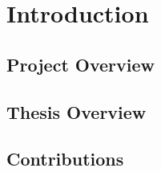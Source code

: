 \resetdatestamp

\chapter{Introduction}

\begin{comment}
A thesis should present results in a scholarly fashion.
The following discusses the organization of a thesis, such as would be
 appropriate to presenting research results pertaining to Electrical \&
 Computer Engineering.
\end{comment}

\section{Project Overview}

\begin{comment}
The terms of reference differ for a Master's Thesis and a Doctoral Thesis.
For the Master's Thesis, the Faculty of Graduate Studies and Research at
McGill University \cite{McGillTG:P1994} gives the following guidelines.

The terms of reference state that ``In most disciplines, Master's theses will
 not exceed 100 pages.''
\end{comment}

\section{Thesis Overview}

\section{Contributions}
